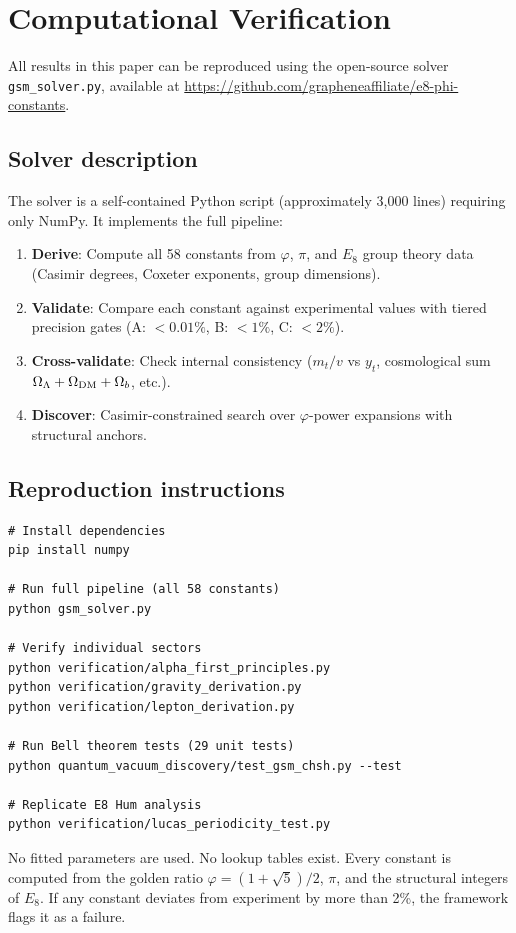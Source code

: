 \documentclass[aps,prd,twocolumn,superscriptaddress,nofootinbib,showpacs]{revtex4-2}
\newcommand{\Oml}{\Omega_\Lambda}
\newcommand{\Omb}{\Omega_b}
\newcommand{\Omdm}{\Omega_{\rm DM}}
\begin{document}
\section{Computational Verification}\label{app:computation}

All results in this paper can be reproduced using the open-source
solver \texttt{gsm\_solver.py}, available at
\url{https://github.com/grapheneaffiliate/e8-phi-constants}.

\subsection{Solver description}

The solver is a self-contained Python script (approximately 3{,}000
lines) requiring only NumPy.  It implements the full pipeline:
\begin{enumerate}
\item \textbf{Derive}: Compute all 58 constants from $\varphi$, $\pi$,
and $E_8$ group theory data (Casimir degrees, Coxeter exponents, group
dimensions).
\item \textbf{Validate}: Compare each constant against experimental
values with tiered precision gates (A: ${<}0.01\%$, B: ${<}1\%$, C:
${<}2\%$).
\item \textbf{Cross-validate}: Check internal consistency ($m_t/v$ vs
$y_t$, cosmological sum $\Oml + \Omdm + \Omb$, etc.).
\item \textbf{Discover}: Casimir-constrained search over
$\varphi$-power expansions with structural anchors.
\end{enumerate}

\subsection{Reproduction instructions}

\begin{verbatim}
# Install dependencies
pip install numpy

# Run full pipeline (all 58 constants)
python gsm_solver.py

# Verify individual sectors
python verification/alpha_first_principles.py
python verification/gravity_derivation.py
python verification/lepton_derivation.py

# Run Bell theorem tests (29 unit tests)
python quantum_vacuum_discovery/test_gsm_chsh.py --test

# Replicate E8 Hum analysis
python verification/lucas_periodicity_test.py
\end{verbatim}

No fitted parameters are used.  No lookup tables exist.  Every
constant is computed from the golden ratio $\varphi = (1+\sqrt{5})/2$,
$\pi$, and the structural integers of $E_8$.  If any constant
deviates from experiment by more than 2\%, the framework flags it as a
failure.
\end{document}

